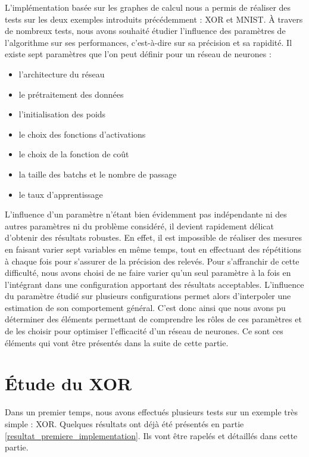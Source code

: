 \documentclass{report}
\theoremstyle{plain}
\theoremstyle{definition}
\theoremstyle{remark}
\begin{document}
L'implémentation basée sur les graphes de calcul nous a permis de réaliser des tests sur les deux exemples introduits précédemment : XOR et MNIST. \`A travers de nombreux tests, nous avons souhaité étudier l'influence des paramètres de l'algorithme sur ses performances, c'est-à-dire sur sa précision et sa rapidité.
\medbreak
Il existe sept paramètres que l'on peut définir pour un réseau de neurones :
\begin{itemize}
\item l'architecture du réseau
\item le prétraitement des données
\item l'initialisation des poids
\item le choix des fonctions d'activations
\item le choix de la fonction de coût
\item la taille des batchs et le nombre de passage
\item le taux d'apprentissage
\end{itemize}
\medbreak
L'influence d'un paramètre n'étant bien évidemment pas indépendante ni des autres paramètres ni du problème considéré, il devient rapidement délicat d'obtenir des résultats robustes. En effet, il est impossible de réaliser des mesures en faisant varier sept variables en même temps, tout en effectuant des répétitions à chaque fois pour s'assurer de la précision des relevés. Pour s'affranchir de cette difficulté, nous avons choisi de ne faire varier qu'un seul paramètre à la fois en l'intégrant dans une configuration apportant des résultats acceptables. L'influence du paramètre étudié sur plusieurs configurations permet alors d'interpoler une estimation de son comportement général.
C'est donc ainsi que nous avons pu déterminer des éléments permettant de comprendre les rôles de ces paramètres et de les choisir pour optimiser l'efficacité d'un réseau de neurones. Ce sont ces éléments qui vont être présentés dans la suite de cette partie.

\section{\'Etude du XOR}

Dans un premier temps, nous avons effectués plusieurs tests sur un exemple très simple : XOR.
Quelques résultats ont déjà été présentés en partie \ref{resultat_premiere_implementation}. Ils vont être rapelés et détaillés dans cette partie.
\end{document}

